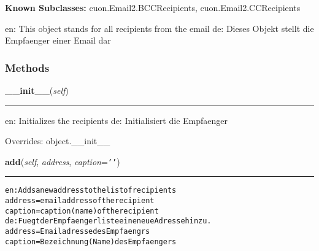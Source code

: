 \textbf{Known Subclasses:}
cuon.Email2.BCCRecipients,
    cuon.Email2.CCRecipients

en: This object stands for all recipients from the email de: Dieses Objekt 
stellt die Empfaenger einer Email dar



  \subsubsection{Methods}

    \vspace{0.5ex}

\hspace{.8\funcindent}\begin{boxedminipage}{\funcwidth}

    \raggedright \textbf{\_\_init\_\_}(\textit{self})

    \vspace{-1.5ex}

    \rule{\textwidth}{0.5\fboxrule}
\setlength{\parskip}{2ex}
    en: Initializes the recipients de: Initialisiert die Empfaenger

\setlength{\parskip}{1ex}
      Overrides: object.\_\_init\_\_

    \end{boxedminipage}

    \label{cuon:Email2:Recipients:add}

    \vspace{0.5ex}

\hspace{.8\funcindent}\begin{boxedminipage}{\funcwidth}

    \raggedright \textbf{add}(\textit{self}, \textit{address}, \textit{caption}={\tt \texttt{'}\texttt{}\texttt{'}})

    \vspace{-1.5ex}

    \rule{\textwidth}{0.5\fboxrule}
\setlength{\parskip}{2ex}
\begin{alltt}

en: Adds a new address to the list of recipients
    address = email address of the recipient
    caption = caption (name) of the recipient
de: Fuegt der Empfaengerliste eine neue Adresse hinzu.
    address = Emailadresse des Empfaengrs
    caption = Bezeichnung (Name) des Empfaengers
\end{alltt}

\setlength{\parskip}{1ex}
    \end{boxedminipage}

